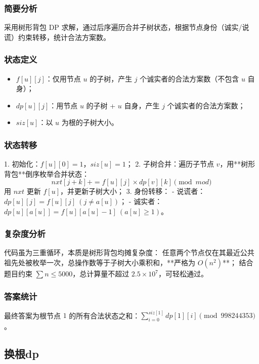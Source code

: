 \documentclass[11pt,a4paper,twocolumn]{ctexart}  %
\begin{document}
\subsubsection*{简要分析}
采用树形背包 DP 求解，通过后序遍历合并子树状态，根据节点身份（诚实/说谎）约束转移，统计合法方案数。

\subsubsection*{状态定义}
\begin{itemize}
    \item $f[u][j]$：仅用节点 $u$ 的子树，产生 $j$ 个诚实者的合法方案数（不包含 $u$ 自身）；
    \item $dp[u][j]$：用节点 $u$ 的子树 + $u$ 自身，产生 $j$ 个诚实者的合法方案数；
    \item $siz[u]$：以 $u$ 为根的子树大小。
\end{itemize}

\subsubsection*{状态转移}
1. 初始化：$f[u][0] = 1$，$siz[u] = 1$；
2. 子树合并：遍历子节点 $v$，用**树形背包**倒序枚举合并状态：
   \[nxt[j+k] += f[u][j] \times dp[v][k] \pmod{mod}\]
   用 $nxt$ 更新 $f[u]$，并更新子树大小；
3. 身份转移：
   - 说谎者：$dp[u][j] = f[u][j] \ (j \neq a[u])$；
   - 诚实者：$dp[u][a[u]] = f[u][a[u]-1] \ (a[u] \ge 1)$。

\subsubsection*{复杂度分析}
代码虽为三重循环，本质是树形背包均摊复杂度：
任意两个节点仅在其最近公共祖先处被枚举一次，总操作数等于子树大小乘积和，**严格为 $O(n^2)$**；
结合题目约束 $\sum n \le 5000$，总计算量不超过 $2.5 \times 10^7$，可轻松通过。

\subsubsection*{答案统计}
最终答案为根节点 $1$ 的所有合法状态之和：$\sum\limits_{i=0}^{siz[1]} dp[1][i] \pmod{998244353}$。


\subsection{换根dp}

\end{document}
